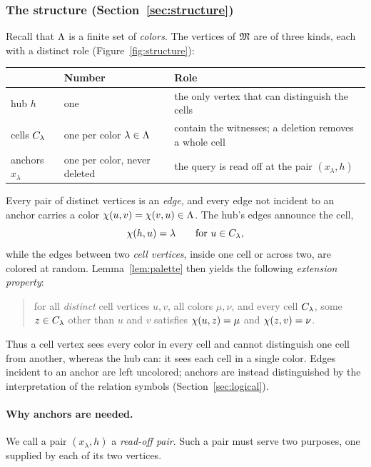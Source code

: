 \subsubsection{The structure (Section~\ref{sec:structure})}\label{ov:structure}
Recall that $\Lambda$ is a finite set of \emph{colors}. The vertices of $\mathfrak M$
are of three kinds, each with a distinct role (Figure~\ref{fig:structure}):
\begin{center}
\renewcommand{\arraystretch}{1.15}
\begin{tabular}{@{}lll@{}}
\toprule
 &Number&Role\\
\midrule
hub $h$&one&the only vertex that can distinguish the cells\\
cells $C_{\lambda}$&one per color $\lambda\in\Lambda$&contain the witnesses; a deletion removes a whole cell\\
anchors $x_\lambda$&one per color, never deleted&the query is read off at the pair $(x_\lambda,h)$\\
\bottomrule
\end{tabular}
\end{center}
Every pair of distinct vertices is an \emph{edge}, and every edge not
incident to an anchor carries a color $\chi(u,v)=\chi(v,u)\in\Lambda$. The
hub's edges announce the cell,
\[
 \chi(h,u)=\lambda\qquad\text{for }u\in C_{\lambda},
\]
while the edges between two \emph{cell vertices}, inside one cell or across
two, are colored at random. Lemma~\ref{lem:palette} then yields the
following \emph{extension property}:
\begin{quote}
for all \emph{distinct} cell vertices $u,v$, all colors $\mu,\nu$, and every
cell $C_{\lambda}$, some $z\in C_{\lambda}$ other than $u$ and $v$
satisfies $\chi(u,z)=\mu$ and $\chi(z,v)=\nu$.
\end{quote}
Thus a cell vertex sees every color in every cell and cannot distinguish one
cell from another, whereas the hub can: it sees each cell in a single color.
Edges incident to an anchor are left uncolored; anchors are instead
distinguished by the interpretation of the relation symbols
(Section~\ref{sec:logical}).


\paragraph{Why anchors are needed.}
We call a pair $(x_\lambda,h)$ a \emph{read-off pair}. Such a pair must
serve two purposes, one supplied by each of its two vertices.

